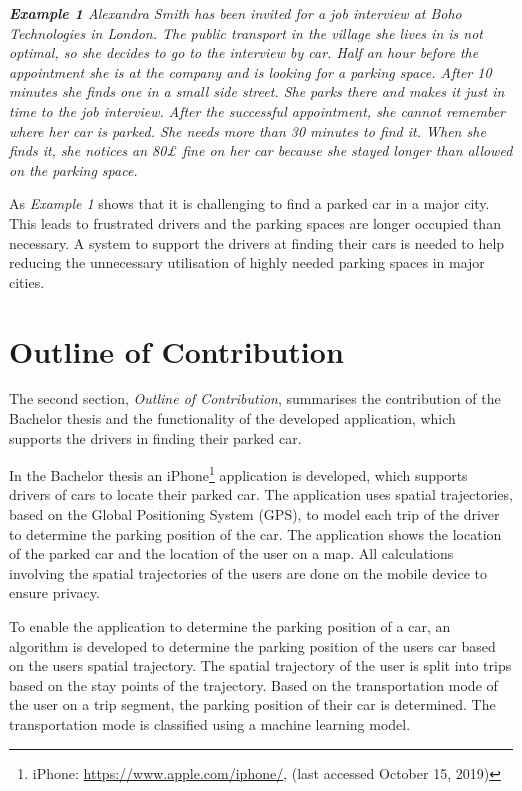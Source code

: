 \textit{\textbf{Example 1}
Alexandra Smith has been invited for a job interview at Boho Technologies in London. The public transport in the village she lives in is not optimal, so she decides to go to the interview by car. Half an hour before the appointment she is at the company and is looking for a parking space. After 10 minutes she finds one in a small side street. She parks there and makes it just in time to the job interview. After the successful appointment, she cannot remember where her car is parked. She needs more than 30 minutes to find it. When she finds it, she notices an 80£ fine on her car because she stayed longer than allowed on the parking space.
}

As \textit{Example 1} shows that it is challenging to find a parked car in a major city. This leads to frustrated drivers and the parking spaces are longer occupied than necessary. A system to support the drivers at finding their cars is needed to help reducing the unnecessary utilisation of highly needed parking spaces in major cities.

\section{Outline of Contribution}
The second section, \textit{Outline of Contribution}, summarises the contribution of the Bachelor thesis and the functionality of the developed application, which supports the drivers in finding their parked car. 

In the Bachelor thesis an iPhone\footnote{iPhone: \url{https://www.apple.com/iphone/}, (last accessed October 15, 2019)} application is developed, which supports drivers of cars to locate their parked car. The application uses spatial trajectories, based on the Global Positioning System (GPS), to model each trip of the driver to determine the parking position of the car. The application shows the location of the parked car and the location of the user on a map. All calculations involving the spatial trajectories of the users are done on the mobile device to ensure privacy.

To enable the application to determine the parking position of a car, an algorithm is developed to determine the parking position of the users car based on the users spatial trajectory. The spatial trajectory of the user is split into trips based on the stay points of the trajectory. Based on the transportation mode of the user on a trip segment, the parking position of their car is determined. The transportation mode is classified using a machine learning model. 

